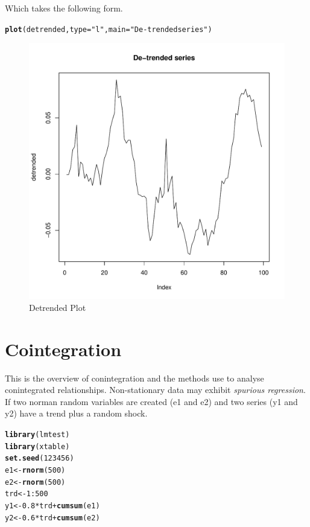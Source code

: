 \documentclass{article}\usepackage{graphicx, color}
\makeatletter
\def\maxwidth{ %
  \ifdim\Gin@nat@width>\linewidth
    \linewidth
  \else
    \Gin@nat@width
  \fi
}
\newcommand{\hlfunctioncall}[1]{\textcolor[rgb]{0.501960784313725,0,0.329411764705882}{\textbf{#1}}}%
\newcommand{\hlstring}[1]{\textcolor[rgb]{0.6,0.6,1}{#1}}%
\newenvironment{kframe}{%
 \def\at@end@of@kframe{}%
 \ifinner\ifhmode%
  \def\at@end@of@kframe{\end{minipage}}%
  \begin{minipage}{\columnwidth}%
 \fi\fi%
 \def\FrameCommand##1{\hskip\@totalleftmargin \hskip-\fboxsep
 \colorbox{shadecolor}{##1}\hskip-\fboxsep
     \hskip-\linewidth \hskip-\@totalleftmargin \hskip\columnwidth}%
 \MakeFramed {\advance\hsize-\width
   \@totalleftmargin\z@ \linewidth\hsize
   \@setminipage}}%
 {\par\unskip\endMakeFramed%
 \at@end@of@kframe}
\newenvironment{knitrout}{}{} %
\makeatother
\begin{document}
Which takes the following form. 
\begin{knitrout}
\color{fgcolor}\begin{kframe}
\begin{alltt}
\hlfunctioncall{plot}(detrended, type = \hlstring{"l"}, main = \hlstring{"De-trended series"})
\end{alltt}
\end{kframe}\begin{figure}[h]

\includegraphics[width=\maxwidth]{figure/Plot-Detrend} \caption[Detrended Plot]{Detrended Plot\label{fig:Plot-Detrend}}
\end{figure}


\end{knitrout}


\section{Cointegration}
This is the overview of conintegration and the methods use to analyse conintegrated relationships. Non-stationary data may exhibit \emph{spurious regression}.  If two norman random variables are created (e1 and e2) and two series (y1 and y2) have a trend plus a random shock. 
\begin{knitrout}
\color{fgcolor}\begin{kframe}
\begin{alltt}
\hlfunctioncall{library}(lmtest)
\hlfunctioncall{library}(xtable)
\hlfunctioncall{set.seed}(123456)
e1 <- \hlfunctioncall{rnorm}(500)
e2 <- \hlfunctioncall{rnorm}(500)
trd <- 1:500
y1 <- 0.8 * trd + \hlfunctioncall{cumsum}(e1)
y2 <- 0.6 * trd + \hlfunctioncall{cumsum}(e2)
\end{alltt}
\end{kframe}
\end{knitrout}
\end{document}
